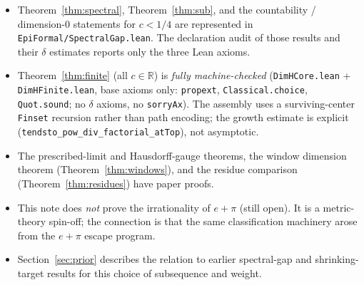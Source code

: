 \documentclass[11pt]{article}
\theoremstyle{definition}
\theoremstyle{remark}
\newcommand{\R}{\mathbb{R}}
\begin{document}
\begin{itemize}[leftmargin=1.5em]
\item Theorem~\ref{thm:spectral}, Theorem~\ref{thm:sub}, and the countability /
dimension-$0$ statements for $c<1/4$ are represented in
\texttt{EpiFormal/SpectralGap.lean}. The declaration audit of those
results and their $\delta$ estimates reports only the three Lean axioms.
\item Theorem~\ref{thm:finite} (all $c\in\R$) is \emph{fully machine-checked}
(\texttt{DimHCore.lean} + \texttt{DimHFinite.lean}, base axioms only:
\texttt{propext}, \texttt{Classical.choice}, \texttt{Quot.sound}; no
$\delta$ axioms, no \texttt{sorryAx}). The assembly uses a surviving-center
\texttt{Finset} recursion rather than path encoding; the growth estimate is
explicit (\texttt{tendsto\_pow\_div\_factorial\_atTop}), not asymptotic.
\item The prescribed-limit and Hausdorff-gauge theorems, the window dimension theorem (Theorem~\ref{thm:windows}), and the residue comparison (Theorem~\ref{thm:residues}) have paper proofs.
\item This note does \emph{not} prove the irrationality of $e+\pi$ (still open).
It is a metric-theory spin-off; the connection is that the same classification
machinery arose from the $e+\pi$ escape program.
\item Section~\ref{sec:prior} describes the relation to earlier spectral-gap
and shrinking-target results for this choice of subsequence and weight.
\end{itemize}
\end{document}
